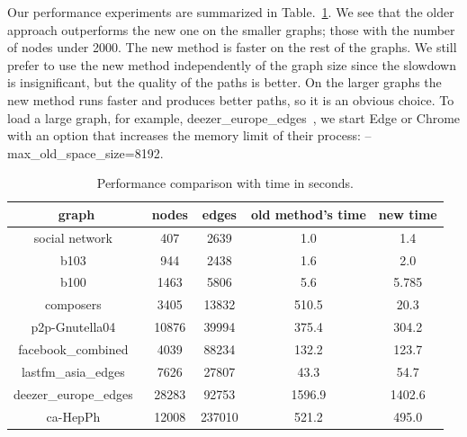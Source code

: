 \documentclass{gd-llncs}
\begin{document}
{Our performance experiments are summarized in Table.~\ref{tab:perf}. We see that the older approach outperforms the new one on the smaller graphs;
those with the number of nodes under 2000. The new method is faster on the rest of the graphs.
We still prefer to use the new method independently of the graph size since the slowdown is insignificant, but the quality of the paths is better.
On the larger graphs the new method runs faster and produces better paths, so it is an obvious choice.
To load a large graph, for example, deezer\_europe\_edges~\cite{feather}, we start Edge or Chrome with an option that increases the memory limit
of their process: -- max\_old\_space\_size=8192.

\begin{table}
  \begin{center}
    \begin{tabular}{||c |c| c| c| c||}
      \hline
      graph                                   & nodes & edges  & old method's time & new time \\ [0.5ex]
      \hline\hline
      social network~\cite{beveridge2018game} & 407   & 2639   & 1.0               & 1.4      \\
      \hline
      b103~\cite{b103}                        & 944   & 2438   & 1.6               & 2.0      \\
      \hline
      b100~\cite{b100}                        & 1463  & 5806   & 5.6               & 5.785    \\
      \hline
      composers~\cite{composers}              & 3405  & 13832  & 510.5             & 20.3     \\
      \hline
      p2p-Gnutella04~\cite{gnutella}          & 10876 & 39994  & 375.4             & 304.2    \\
      \hline
      facebook\_combined~\cite{fb}            & 4039  & 88234  & 132.2             & 123.7    \\
      \hline
      lastfm\_asia\_edges~\cite{feather}      & 7626  & 27807  & 43.3              & 54.7     \\
      \hline
      deezer\_europe\_edges~\cite{feather}    & 28283 & 92753  & 1596.9            & 1402.6   \\
      \hline
      ca-HepPh~\cite{leskovec2007graph}       & 12008 & 237010 & 521.2             & 495.0    \\
      \hline
    \end{tabular}
    \caption{Performance comparison with time in seconds.}
    \label{tab:perf}
  \end{center}


\end{table}}
\end{document}
